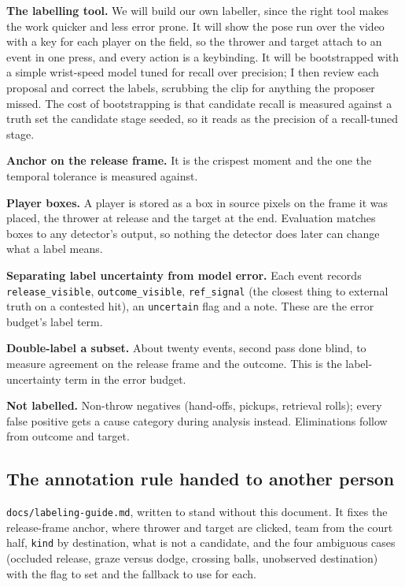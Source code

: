 \documentclass[10pt,a4paper]{article}
\begin{document}
\textbf{The labelling tool.} We will build our own labeller, since the right tool makes
the work quicker and less error prone. It will show the pose run over the video with a key
for each player on the field, so the thrower and target attach to an event in one press,
and every action is a keybinding. It will be bootstrapped with a simple wrist-speed model
tuned for recall over precision; I then review each proposal and correct the labels,
scrubbing the clip for anything the proposer missed. The cost of bootstrapping is that
candidate recall is measured against a truth set the candidate stage seeded, so it reads as
the precision of a recall-tuned stage.

\textbf{Anchor on the release frame.} It is the crispest moment and the one the temporal
tolerance is measured against.

\textbf{Player boxes.} A player is stored as a box in source pixels on the
frame it was placed, the thrower at release and the target at the end. Evaluation matches
boxes to any detector's output, so nothing the detector does later can change what a label
means.

\textbf{Separating label uncertainty from model error.} Each event records
\texttt{release\_visible}, \texttt{outcome\_visible}, \texttt{ref\_signal} (the closest
thing to external truth on a contested hit), an \texttt{uncertain} flag and a note. These
are the error budget's label term.

\textbf{Double-label a subset.} About twenty events, second pass done blind, to measure
agreement on the release frame and the outcome. This is the label-uncertainty term in the
error budget.

\textbf{Not labelled.} Non-throw negatives (hand-offs, pickups, retrieval rolls); every
false positive gets a cause category during analysis instead. Eliminations follow from
outcome and target.

\subsection{The annotation rule handed to another person}

\texttt{docs/labeling-guide.md}, written to stand without this document. It fixes the
release-frame anchor, where thrower and target are clicked, team from the court half,
\texttt{kind} by destination, what is not a candidate, and the four ambiguous cases
(occluded release, graze versus dodge, crossing balls, unobserved destination) with the flag
to set and the fallback to use for each.
\end{document}
